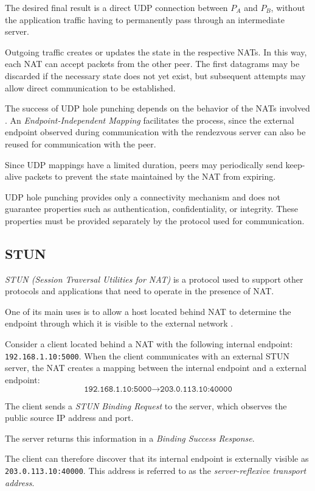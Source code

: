 The desired final result is a direct UDP connection between \(P_A\) and \(P_B\), without the application traffic having to permanently pass through an intermediate server.

Outgoing traffic creates or updates the state in the respective NATs. In this way, each NAT can accept packets from the other peer. The first datagrams may be discarded if the necessary state does not yet exist,
but subsequent attempts may allow direct communication to be established.

The success of UDP hole punching depends on the behavior of the NATs involved \cite{rfc5128}. An \textit{Endpoint-Independent Mapping} facilitates the process, since the external endpoint observed during communication with the rendezvous server can also be reused for communication with the peer.

Since UDP mappings have a limited duration, peers may periodically send keep-alive packets to prevent the state maintained by the NAT from expiring.

UDP hole punching provides only a connectivity mechanism and does not guarantee properties such as authentication, confidentiality, or integrity. These properties must be provided separately by the protocol used for communication.

\subsection{STUN}
\begin{definition}
	\textit{STUN (Session Traversal Utilities for NAT)} is a protocol used to support other protocols and applications that need to operate in the presence of NAT.
\end{definition}
One of its main uses is to allow a host located behind NAT to determine the endpoint through which it is visible to the external network \cite{rfc8489}.

\begin{example}
	Consider a client located behind a NAT with the following
	internal endpoint: \texttt{192.168.1.10:5000}.
	When the client communicates with an external STUN server,
	the NAT creates a mapping between the internal endpoint
	and a external endpoint: \[
		\texttt{192.168.1.10:5000}
		\longrightarrow
		\texttt{203.0.113.10:40000}
	\]

	The client sends a \textit{STUN Binding Request} to the server,
	which observes the public source IP address and port.

	The server returns this information in a
	\textit{Binding Success Response}.

	The client can therefore discover that its internal endpoint
	is externally visible as \texttt{203.0.113.10:40000}. This address is referred to as the
	\textit{server-reflexive transport address}.
\end{example}

